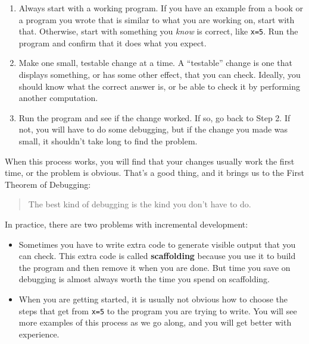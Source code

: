 \documentclass[12pt]{book}
\theoremstyle{exercise}
\begin{document}
\begin{enumerate}

\item Always start with a working program.  If you have an
example from a book or a program you wrote that is similar to
what you are working on, start with that.  Otherwise, start with
something you {\em know} is correct, like {\tt x=5}.  Run the program
and confirm that it does what you expect.

\item Make one small, testable change at a time.  A ``testable''
change is one that displays something, or has some
other effect, that you can check.  Ideally, you should know what
the correct answer is, or be able to check it by performing another
computation. 

\item Run the program and see if the change worked.  If so, go back
to Step 2.  If not, you will have to do some debugging, but if the
change you made was small, it shouldn't take long to find the problem.

\end{enumerate}

When this process works, you will find that your changes usually
work the first time, or the problem is obvious.  That's a good thing,
and it brings us to the First Theorem of Debugging:

\begin{quote}
The best kind of debugging is the kind you don't have to do.
\end{quote}

In practice, there are two problems with incremental development:

\begin{itemize}

\item Sometimes you have to write extra code to generate visible output that you can check.  This extra code is called {\bf scaffolding} because you use it to build the program and then remove it when you are done.  But time you save on debugging is almost always worth the time you spend on
scaffolding.

\item When you are getting started, it is usually not obvious how to
choose the steps that get from {\tt x=5} to the program you are trying
to write.  You will see more examples of this process as we go along, and you will get better with experience.

\end{itemize}
\end{document}
